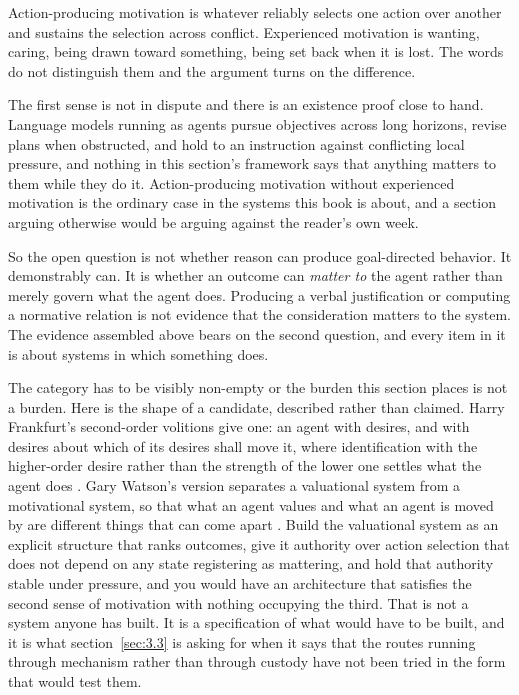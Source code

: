 Action-producing motivation is whatever reliably selects one action over another and sustains the selection across conflict. Experienced motivation is wanting, caring, being drawn toward something, being set back when it is lost. The words do not distinguish them and the argument turns on the difference.

The first sense is not in dispute and there is an existence proof close to hand. Language models running as agents pursue objectives across long horizons, revise plans when obstructed, and hold to an instruction against conflicting local pressure, and nothing in this section's framework says that anything matters to them while they do it. Action-producing motivation without experienced motivation is the ordinary case in the systems this book is about, and a section arguing otherwise would be arguing against the reader's own week.

So the open question is not whether reason can produce goal-directed behavior. It demonstrably can. It is whether an outcome can \emph{matter to} the agent rather than merely govern what the agent does. Producing a verbal justification or computing a normative relation is not evidence that the consideration matters to the system. The evidence assembled above bears on the second question, and every item in it is about systems in which something does.

The category has to be visibly non-empty or the burden this section places is not a burden. Here is the shape of a candidate, described rather than claimed. Harry Frankfurt's second-order volitions give one: an agent with desires, and with desires about which of its desires shall move it, where identification with the higher-order desire rather than the strength of the lower one settles what the agent does \autocite{frankfurt1971freedom}. Gary Watson's version separates a valuational system from a motivational system, so that what an agent values and what an agent is moved by are different things that can come apart \autocite{watson1975free}. Build the valuational system as an explicit structure that ranks outcomes, give it authority over action selection that does not depend on any state registering as mattering, and hold that authority stable under pressure, and you would have an architecture that satisfies the second sense of motivation with nothing occupying the third. That is not a system anyone has built. It is a specification of what would have to be built, and it is what section~\ref{sec:3.3} is asking for when it says that the routes running through mechanism rather than through custody have not been tried in the form that would test them.

